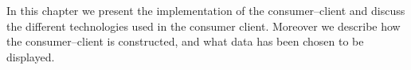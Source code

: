 In this chapter we present the implementation of the consumer--client and discuss the different technologies used in the consumer client.
Moreover we describe how the consumer--client is constructed, and what data has been chosen to be displayed.
